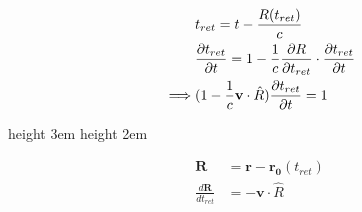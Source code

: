 \documentclass[11pt,a4paper]{article}
\begin{document}
\begin{minipage}[c]{0.70\textwidth}
\begin{align}
    & t_{ret} = t-\frac{R(t_{ret})}{c} \notag \\
    & \frac{\partial t_{ret}}{\partial t} = 1-\frac{1}{c} \frac{\partial R}{\partial t_{ret}} \cdot \frac{\partial t_{ret}}{\partial t} \notag \\
    \implies & (1 - \frac{1}{c} \mathbf{v}\cdot \hat{R}) \frac{\partial t_{ret}}{\partial t} = 1 \notag 
\end{align}
\end{minipage}
\hspace{0.5em}\vrule height 3em \hspace{0.02em} \vrule height 2em \hspace{1em}
\begin{minipage}[c]{0.18\textwidth}
\begin{align*}
    \mathbf{R} &= \mathbf{r}-\mathbf{r_0}(t_{ret}) \\
    \frac{d\mathbf{R}}{dt_{ret}} &= -\mathbf{v}\cdot \hat{R}
\end{align*}
\end{minipage} 
\end{document}
